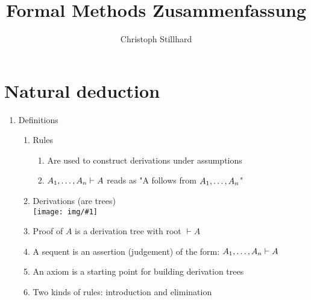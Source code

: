 \documentclass[10pt]{article}
\title{\textbf{Formal Methods Zusammenfassung}}
\author{Christoph Stillhard}
\date{}
\newcommand{\enumstart}{\begin{enumerate}}
\newcommand{\enumend}{\end{enumerate}}
\newcommand{\image}[1]{\texttt{[image: img/\#1]}}
\begin{document}
\maketitle
{}
\thispagestyle{empty}

\let\stdsection\section
\renewcommand\section{\newpage\stdsection}

\newpage
{}
\setcounter{page}{1}
\tableofcontents

\newpage
{}
\setcounter{page}{1}

\section{Natural deduction}
\enumstart
	\item Definitions
	\enumstart
		\item Rules
		\enumstart
			\item Are used to construct derivations under assumptions
			\item $A_1, \mathellipsis, A_n  \vdash A$ reads as "A follows from $A_1, \mathellipsis, A_n$"
		\enumend
		\item Derivations (are trees)
			\\ \image{example_derivation_tree.png}
		\item Proof of $A$ is a derivation tree with root $\vdash A$
		\item A sequent is an assertion (judgement) of the form: $A_1, \mathellipsis, A_n \vdash A$
		\item An axiom is a starting point for building derivation trees
		\item Two kinds of rules: introduction and elimination
	\enumend
\enumend
\end{document}
